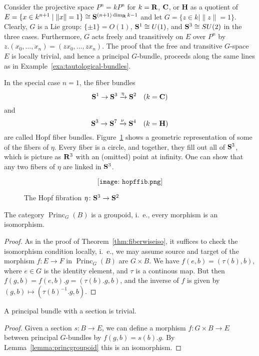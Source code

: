 \documentclass[a4paper,openany]{scrbook}
\DeclareMathOperator{\Princ}{Princ}
\begin{document}
\begin{example}
Consider the projective space $P^n = kP^n$ for $k=\R$, $\CC$, or $\mathbf H$ as a quotient of $E=\{ x \in k^{n+1} \mid \|x\|=1\} \cong \S^{(n+1)\dim_\R k-1}$ and let $G = \{ z \in k \mid \|z\|=1\}$. Clearly, $G$ is a Lie group: $\{\pm 1\}=O(1)$, $\S^1 \cong U(1)$, and $\S^3 \cong SU(2)$ in the three cases. Furthermore, $G$ acts freely and transitively on $E$ over $P^n$ by $z.(x_0,\dots,x_n) = (zx_0,\dots,zx_n)$. The proof that the free and transitive $G$-space $E$ is locally trivial, and hence a principal $G$-bundle, proceeds along the same lines as in Example~\ref{exa:tautological-bundles}.

In the special case $n=1$, the fiber bundles
\[
\S^1 \to \S^3 \xrightarrow{\eta} \S^2 \quad (k=\CC)
\]
and
\[
\S^3 \to \S^7 \xrightarrow{\nu} \S^4 \quad (k=\mathbf H)
\]
are called Hopf fiber bundles. Figure~\ref{fig:hopffib} shows a geometric representation of some of the fibers of $\eta$. Every fiber is a circle, and together, they fill out all of $\S^3$, which is picture as $\R^3$ with an (omitted) point at infinity. One can show that any two fibers of $\eta$ are linked in $\S^3$.
\begin{figure}[ht]\[\texttt{[image: hopffib.png]}\]\caption{The Hopf fibration $\eta\colon \S^3 \to \S^2$}\label{fig:hopffib}\end{figure}
\end{example}

\begin{lemma}\label{lemma:princgroupoid}
The category $\Princ_G(B)$ is a groupoid, i.~e., every morphism is an isomorphism.
\end{lemma}
\begin{proof}
  As in the proof of Theorem~\ref{thm:fiberwiseiso}, it suffices to check the isomorphism condition locally, i.~e., we may assume source and target of the morphism $f\colon E \to F$ in $\Princ_G(B)$ are $G \times B$. We have $f(e,b)=(\tau(b),b)$, where $e \in G$ is the identity element, and $\tau$ is a continous map. But then $f(g,b) = f(e,b).g= (\tau(b).g,b)$, and the inverse of $f$ is given by $(g,b) \mapsto (\tau(b)^{-1}.g,b)$.
\end{proof}

\begin{corollary}
A principal bundle with a section is trivial.
\end{corollary}
\begin{proof}
  Given a section $s\colon B \to E$, we can define a morphism $f\colon G \times B \rightarrow E$ between principal $G$-bundles by $f(g,b) = s(b).g$. By Lemma~\ref{lemma:princgroupoid} this is an isomorphism.
\end{proof}
\end{document}
